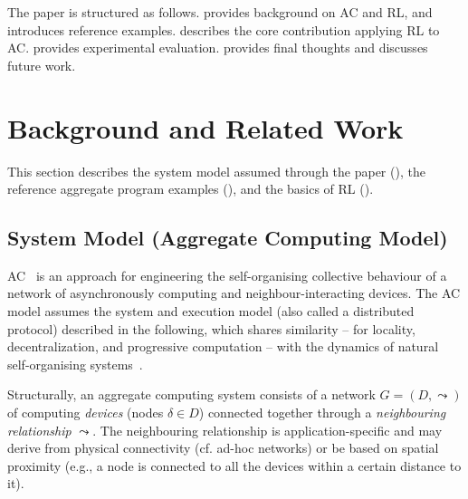 The paper is structured as follows.
%
 provides background on \ac{AC} and \ac{RL}, and introduces reference examples. 
%
 describes the core contribution applying \ac{RL} to \ac{AC}. %
%
 provides experimental evaluation. %
%
 provides final thoughts and discusses future work.

\section{Background and Related Work}
\label{acsos2022:sec:background}

This section
 describes the system model
 assumed through the paper (),
 the reference aggregate program examples
 (),
 and the basics of \ac{RL}
 ().

\subsection{System Model (Aggregate Computing Model)}\label{acsos2022:s:background:ac}

\ac{AC}~\cite{DBLP:journals/computer/BealPV15,DBLP:journals/jlap/ViroliBDACP19}
 is an approach 
 for engineering the self-organising collective behaviour
 of a network of asynchronously computing and neighbour-interacting devices.
%
The \ac{AC} model 
 assumes the system and execution model (also called a distributed protocol) described in the following,
 which shares similarity -- for locality, decentralization, and progressive computation -- with the dynamics of natural self-organising systems~\cite{bonabeau1999swarm-intelligence}.
%

\newcommand{\neigh}{\ensuremath{\leadsto}}
\newcommand{\deviceId}{\ensuremath{\delta}}

Structurally, an aggregate computing system consists of a network $G=(D,\neigh)$ of computing \emph{devices} (nodes $\deviceId \in D$)
 connected together through a \emph{neighbouring relationship} $\neigh$.
%
The neighbouring relationship is application-specific
 and may derive 
 from physical connectivity (cf. ad-hoc networks)
 or 
 be based on spatial proximity (e.g., a node is connected to all the devices within a certain distance to it).

